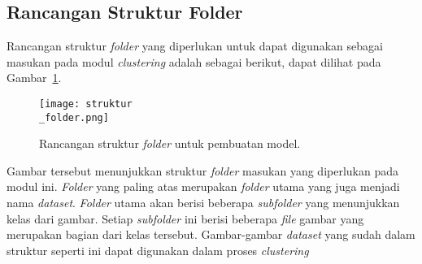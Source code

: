 \subsection{Rancangan Struktur Folder}
\label{subsec:struktur_folder_clustering}
Rancangan struktur \textit{folder} yang diperlukan untuk dapat digunakan sebagai masukan pada modul \textit{clustering} adalah sebagai berikut, dapat dilihat pada Gambar~\ref{fig:struktur_folder}.
\begin{figure}[H]
	\centering
	\texttt{[image: struktur\\\_folder.png]}
	\caption{Rancangan struktur \textit{folder} untuk pembuatan model.}
	\label{fig:struktur_folder}
\end{figure}
Gambar tersebut menunjukkan struktur \textit{folder} masukan yang diperlukan pada modul ini. \textit{Folder} yang paling atas merupakan \textit{folder} utama yang juga menjadi nama \textit{dataset}. \textit{Folder} utama akan berisi beberapa \textit{subfolder} yang menunjukkan kelas dari gambar. Setiap \textit{subfolder} ini berisi beberapa \textit{file} gambar yang merupakan bagian dari kelas tersebut. Gambar-gambar \textit{dataset} yang sudah dalam struktur seperti ini dapat digunakan dalam proses \textit{clustering}

